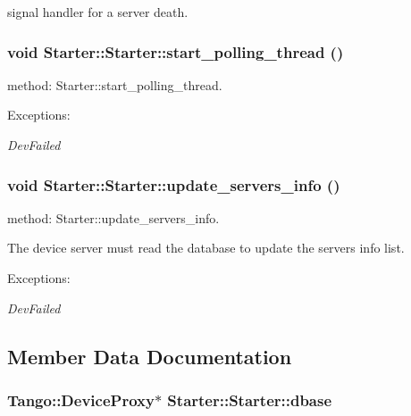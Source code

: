 signal handler for a server death.

\subsubsection{\setlength{\rightskip}{0pt plus 5cm}void Starter::Starter::start\_\-polling\_\-thread ()}\label{classStarter_1_1Starter_z5_9}


method: Starter::start\_\-polling\_\-thread.

\begin{Desc}
\item[Exceptions: ]\par
\begin{description}
\item[{\em 
Dev\-Failed}] \end{description}
\end{Desc}
\subsubsection{\setlength{\rightskip}{0pt plus 5cm}void Starter::Starter::update\_\-servers\_\-info ()}\label{classStarter_1_1Starter_z5_8}


method: Starter::update\_\-servers\_\-info.

The device server must read the database to update the servers info list. \begin{Desc}
\item[Exceptions: ]\par
\begin{description}
\item[{\em 
Dev\-Failed}] \end{description}
\end{Desc}


\subsection{Member Data Documentation}
\subsubsection{\setlength{\rightskip}{0pt plus 5cm}Tango::Device\-Proxy$\ast$ Starter::Starter::dbase}\label{classStarter_1_1Starter_m7}


